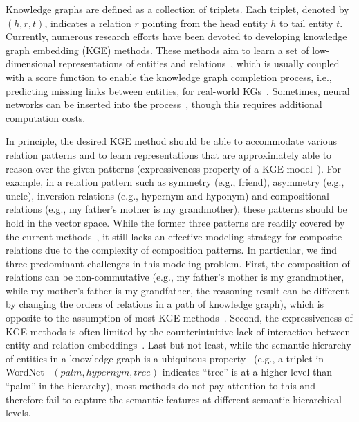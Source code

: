 \documentclass[11pt]{article}
\begin{document}
Knowledge graphs are defined as a collection of triplets. Each triplet, denoted by \((h, r, t)\), indicates a relation \(r\) pointing from the head entity $h$ to tail entity \(t\). Currently, numerous research efforts have been devoted to developing knowledge graph embedding (KGE) methods. These methods aim to learn a set of low-dimensional representations of entities and relations~\cite{ji2020survey,nguyen2017novel}, which is usually coupled with a score function to enable the knowledge graph completion process, i.e., predicting missing links between entities, for real-world KGs~\cite{nickel2016holographic, Lacroix2018CanonicalTD, bordes2013translating, sun2019rotate, zhang2019quaternion}. Sometimes, neural networks can be inserted into the process~\cite{dettmers2018convolutional,schlichtkrull2018modeling,nathani2019learning}, though this requires additional computation costs.



In principle, the desired KGE method should be able to accommodate various relation patterns and to learn representations that are approximately able to reason over the given patterns (expressiveness property of a KGE model~\cite{sun2019rotate, DBLP:journals/corr/abs-1709-04808}). 
For example, in a relation pattern such as symmetry (e.g., friend), asymmetry (e.g., uncle), inversion relations (e.g., hypernym and hyponym) and compositional relations (e.g., my father's mother is my grandmother), these patterns should be hold in the vector space.  
While the former three patterns are readily covered by the current methods~\cite{trouillon2016complex,sun2019rotate}, it still lacks an effective modeling strategy for composite relations due to the complexity of composition patterns. In particular, we find three predominant challenges in this modeling problem. First, the composition of relations can be non-commutative (e.g., my father's mother is my grandmother, while my mother's father is my grandfather, the reasoning result can be different by changing the orders of relations in a path of knowledge graph), which is opposite to the assumption of most KGE methods~\cite{bordes2013translating, sun2019rotate}. Second, the expressiveness of KGE methods is often limited by the counterintuitive lack of interaction between entity and relation embeddings~\cite{yang2014embedding}. Last but not least, while the semantic hierarchy of entities in a knowledge graph is a ubiquitous property~\cite{zhang2020learning}  (e.g., a triplet in WordNet~\cite{miller1995wordnet} \((palm, hypernym, tree)\) indicates ``tree'' is at a higher level than ``palm'' in the hierarchy), most methods do not pay attention to this and therefore fail to capture the semantic features at different semantic hierarchical levels.
\end{document}
